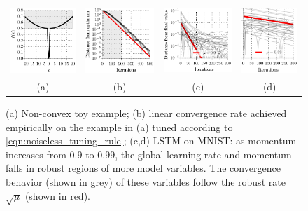 \documentclass{article} %
\begin{document}
\begin{figure}[t]
\centering
\vspace{-2.5em}
\begin{tabular}{c c c c}
  \includegraphics[width=0.23\linewidth]{figures/non_convex_toy} &
  \includegraphics[width=0.24\linewidth]{figures/non_convex_constant_rate} &
  \includegraphics[width=0.24\linewidth]{figures/constant_rate_09} &
  \includegraphics[width=0.19\linewidth]{figures/constant_rate_099} \\
  (a) & (b) & (c) &(d)
\end{tabular}
\caption{(a) Non-convex toy example;
(b) linear convergence rate achieved empirically on the example in (a) tuned according to \eqref{eqn:noiseless_tuning_rule};
(c,d)
LSTM on MNIST: as momentum increases from $0.9$ to $0.99$, the global learning rate and momentum falls in robust regions of more model variables. The convergence behavior (shown in grey) of these variables follow the robust rate $\sqrt{\mu}$ (shown in red).}
\vspace{-0.5em}
\label{fig:curvature_robustness}
\end{figure}
\end{document}

